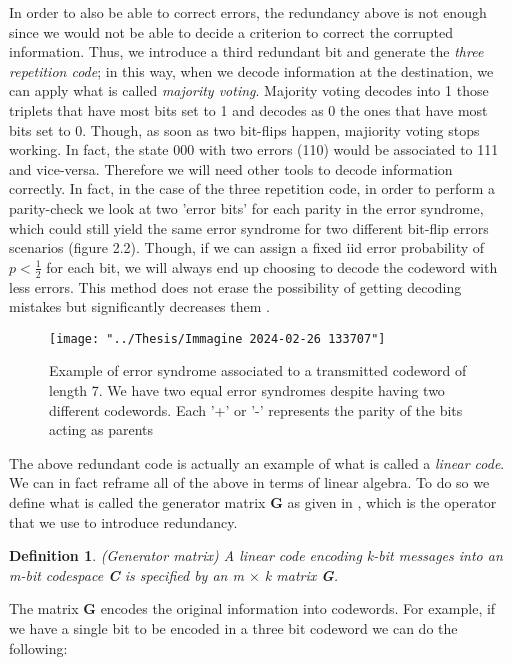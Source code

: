 \documentclass{Configuration_Files/PoliMi3i_thesis}
\newtheorem{definition}{Definition}[chapter]
\begin{document}
In order to also be able to correct errors, the redundancy above is not enough since we would not be able to decide a criterion to correct the corrupted information. Thus, we introduce a third redundant bit and generate the {\it three repetition code}; in this way, when we decode information at the destination, we can apply what is called {\it majority voting}. Majority voting decodes into 1 those triplets that have most bits set to 1 and decodes as 0 the ones that have most bits set to 0. Though, as soon as two bit-flips happen, majiority voting stops working. In fact, the state 000 with two errors (110) would be associated to 111 and vice-versa. Therefore we will need other tools to decode information correctly. In fact, in the case of the three repetition code, in order to perform a parity-check we look at two 'error bits' for each parity in the error syndrome, which could still yield the same error syndrome for two different bit-flip errors scenarios (figure 2.2). Though, if we can assign a fixed iid error probability of $p<\frac{1}{2}$ for each bit, we will always end up choosing to decode the codeword with less errors. This method does not erase the possibility of getting decoding mistakes but significantly decreases them \cite{Kas19}.\newline


\begin{figure}
	\centering
	\texttt{[image: "../Thesis/Immagine 2024-02-26 133707"]}
	\caption{{ Example of error syndrome associated to a transmitted codeword of length 7. We have two equal error syndromes despite having two different codewords. Each '+' or '-' represents the parity of the bits acting as parents \cite{Kas19}}}
	\label{fig:immagine-2024-02-26-133707}
\end{figure}

The above redundant code is actually an example of what is called a {\it linear code}.
We can in fact reframe all of the above in terms of linear algebra. To do so we define what is called the generator matrix  \textbf{G} as given in \cite{Cha06,Kas19}, which is the operator that we use to introduce redundancy. 

\begin{definition}(Generator matrix)
	A linear code encoding k-bit messages into an m-bit codespace \textbf{C} is specified by an m $\times$ k matrix {\bf G}.
\end{definition}

The matrix \textbf{G} encodes the original information into { codewords}. For example, if we have a single bit to be encoded in a three bit codeword we can do the following: 
\end{document}
